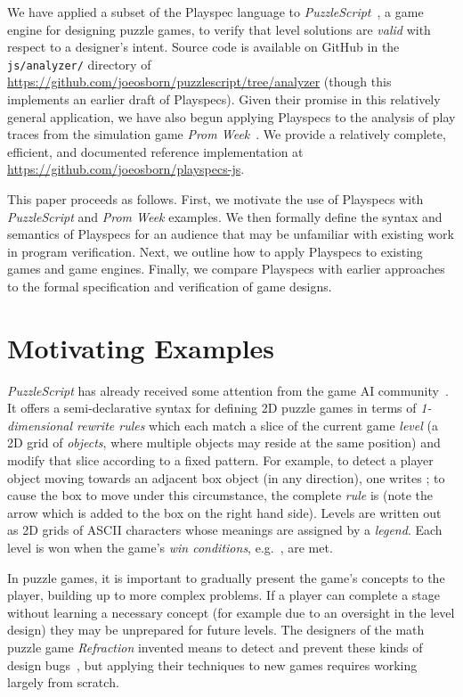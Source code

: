 \documentclass[letterpaper]{article}
\newcommand{\syntax}[1]{\texttt{\detokenize{#1}}}
\begin{document}
We have applied a subset of the Playspec language to \emph{PuzzleScript}~\cite{puzzlescript}, a game engine for designing puzzle games, to verify that level solutions are \emph{valid} with respect to a designer's intent. Source code is available on GitHub in the \verb|js/analyzer/| directory of \url{https://github.com/joeosborn/puzzlescript/tree/analyzer} (though this implements an earlier draft of Playspecs). Given their promise in this relatively general application, we have also begun applying Playspecs to the analysis of play traces from the simulation game \emph{Prom Week}~\cite{mccoy2011prom}. We provide a relatively complete, efficient, and documented reference implementation at \url{https://github.com/joeosborn/playspecs-js}.

This paper proceeds as follows. First, we motivate the use of Playspecs with \emph{PuzzleScript} and \emph{Prom Week} examples. We then formally define the syntax and semantics of Playspecs for an audience that may be unfamiliar with existing work in program verification. Next, we outline how to apply Playspecs to existing games and game engines. Finally, we compare Playspecs with earlier approaches to the formal specification and verification of game designs.

\section{Motivating Examples}
\label{sec:motivations}

\noindent \emph{PuzzleScript} has already received some attention from the game AI community~\cite{lim2014approach}. It offers a semi-declarative syntax for defining 2D puzzle games in terms of \emph{1-dimensional rewrite rules} which each match a slice of the current game \emph{level} (a 2D grid of \emph{objects}, where multiple objects may reside at the same position) and modify that slice according to a fixed pattern. For example, to detect a player object moving towards an adjacent box object (in any direction), one writes \syntax{[> Player | Box]}; to cause the box to move under this circumstance, the complete \emph{rule} is \syntax{[> Player | Box] -> [> Player | > Box]} (note the \syntax{>} arrow which is added to the box on the right hand side). Levels are written out as 2D grids of ASCII characters whose meanings are assigned by a \emph{legend}. Each level is won when the game's \emph{win conditions}, e.g.\ \syntax{all Box on Target}, are met.

In puzzle games, it is important to gradually present the game's concepts to the player, building up to more complex problems. If a player can complete a stage without learning a necessary concept (for example due to an oversight in the level design) they may be unprepared for future levels. The designers of the math puzzle game \emph{Refraction} invented means to detect and prevent these kinds of design bugs~\cite{smith2013quantifying}, but applying their techniques to new games requires working largely from scratch.
\end{document}
